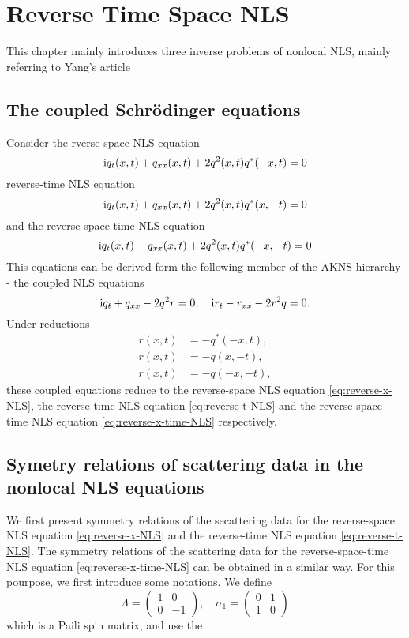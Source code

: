 \chapter{Reverse Time Space NLS}
This chapter mainly introduces three inverse problems of nonlocal NLS, mainly referring to Yang's article\cite{YANG2019328}
\section{The coupled Schrödinger equations}
Consider the rverse-space NLS equation
\begin{equation}
    \mathrm{i} q_{t}(x,t) + q_{xx}(x,t) + 2 q^{2}(x,t) q^{*}(-x,t) = 0 \label{eq:reverse-x-NLS}
\end{equation}
reverse-time NLS equation
\begin{equation}
    \mathrm{i} q_{t}(x,t) + q_{xx}(x,t) + 2 q^{2}(x,t) q^{*}(x,-t) = 0 \label{eq:reverse-t-NLS}
\end{equation}
and the reverse-space-time NLS equation
\begin{equation}
    \mathrm{i} q_{t}(x,t) + q_{xx}(x,t) + 2 q^{2}(x,t) q^{*}(-x,-t) = 0 \label{eq:reverse-x-time-NLS}
\end{equation}
This equations can be derived form the following member of the AKNS hierarchy - the coupled NLS equations
\begin{equation}
    \mathrm{i} q_{t} + q_{xx} - 2q^{2}r = 0, \quad \mathrm{i} r_{t} - r_{xx} - 2r^{2}q = 0. \label{eq:coupled-NLS}
\end{equation}
Under reductions
\begin{align}
    r(x,t) &= -q^{*}(-x,t), \label{eq:reverse-x-NLS-reduction}\\
    r(x,t) &= -q(x,-t), \label{eq:reverse-t-NLS-reduction}\\
    r(x,t) &= -q(-x,-t), \label{eq:reverse-x-time-NLS-reduction}
\end{align}
these coupled equations reduce to the reverse-space NLS equation \eqref{eq:reverse-x-NLS}, the reverse-time NLS equation \eqref{eq:reverse-t-NLS} and the reverse-space-time NLS equation \eqref{eq:reverse-x-time-NLS} respectively.
\section{Symetry relations of scattering data in the nonlocal NLS equations}
We first present symmetry relations of the secattering data for the reverse-space NLS equation \eqref{eq:reverse-x-NLS} and the reverse-time NLS equation \eqref{eq:reverse-t-NLS}. The symmetry relations of the scattering data for the reverse-space-time NLS equation \eqref{eq:reverse-x-time-NLS} can be obtained in a similar way. For this pourpose, we first introduce some notations. We define
\begin{equation}
    \Lambda = \begin{pmatrix}
        1& 0 \\
        0 & -1
    \end{pmatrix}, \quad 
    \sigma_{1} = \begin{pmatrix}
        0 & 1 \\
        1 & 0
    \end{pmatrix}
\end{equation}
which is a Paili spin matrix, and use the
